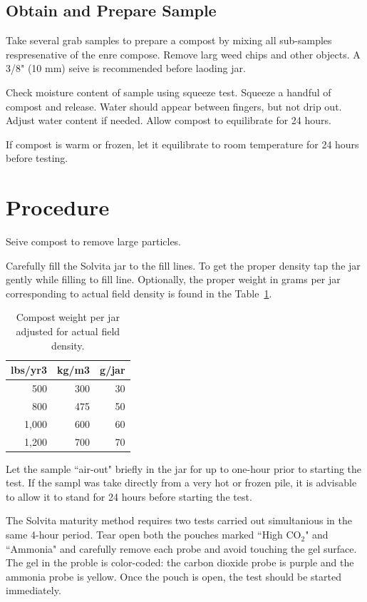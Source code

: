 \documentclass[12pt]{../SOP4_alpha}\usepackage[]{graphicx}\usepackage[]{xcolor}
\begin{document}
\subsection{Obtain and Prepare Sample}

\NP Take several grab samples to prepare a compost by mixing all sub-samples respresenative of the enre compose. Remove larg weed chips and other objects. A 3/8" (10 mm) seive is recommended before laoding jar.

\NP Check moisture content of sample using squeeze test. Squeeze a handful of compost and release. Water should appear between fingers, but not drip out. Adjust water content if needed. Allow compost to equilibrate for 24 hours.

\NP If compost is warm or frozen, let it equilibrate to room temperature for 24 hours before testing.

\section{Procedure}

\NP Seive compost to remove large particles.

\NP Carefully fill the Solvita jar to the fill lines. To get the proper density tap the jar gently while filling to fill line. Optionally, the proper weight in grams per jar corresponding to actual field density is found in the Table~\ref{tab:jarweight}.

\begin{table}[ht]
\caption{Compost weight per jar adjusted for actual field density.}
\label{tab:jarweight}
\centering
\begin{tabular}{rrr}
  \hline
 \textbf{lbs/yr3} & \textbf{kg/m3} & \textbf{g/jar} \\ 
  \hline \hline
  500   & 300   & 30 \\
  800   & 475   & 50 \\
  1,000 & 600   & 60 \\
  1,200 & 700   & 70 \\ \hline
\end{tabular}
\end{table}


\NP Let the sample ``air-out" briefly in the jar for up to one-hour prior to starting the test. If the sampl was take directly from a very hot or frozen pile, it is advisable to allow it to stand for 24 hours before starting the test. 

\NP The Solvita maturity method requires two tests carried out simultanious in the same 4-hour period. Tear open both the pouches marked ``High CO$_2$" and ``Ammonia" and carefully remove each probe and avoid touching the gel surface. The gel in the proble is color-coded: the carbon dioxide probe is purple and the ammonia probe is yellow. Once the pouch is open, the test should be started immediately. 
\end{document}
